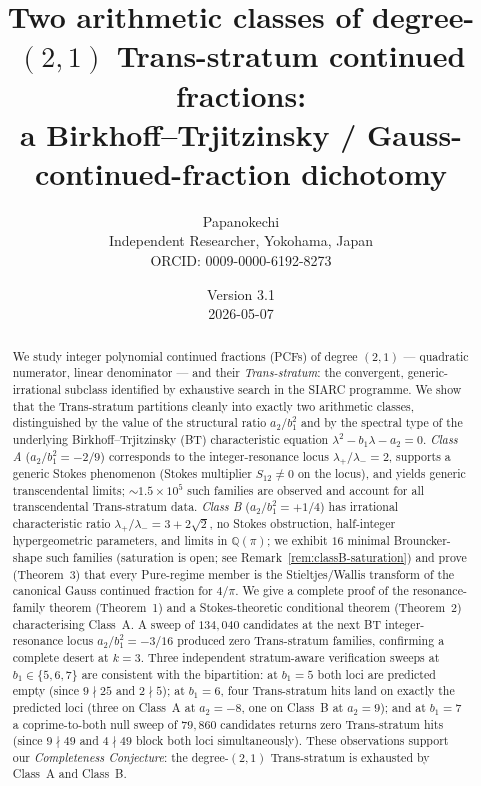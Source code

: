 \documentclass[11pt,a4paper]{article}
\title{Two arithmetic classes of degree-$(2,1)$ Trans-stratum continued fractions:\\
  a Birkhoff--Trjitzinsky / Gauss-continued-fraction dichotomy}
\author{Papanokechi\\
Independent Researcher, Yokohama, Japan\\
ORCID: 0009-0000-6192-8273\\
\email{ppapanokechi@gmail.com}}
\date{Version 3.1 \\ 2026-05-07}
\theoremstyle{definition}
\begin{document}
\maketitle

\begin{abstract}
We study integer polynomial continued fractions (PCFs) of degree $(2,1)$ — quadratic numerator, linear denominator — and their \emph{Trans-stratum}: the convergent, generic-irrational subclass identified by exhaustive search in the SIARC programme. We show that the Trans-stratum partitions cleanly into exactly two arithmetic classes, distinguished by the value of the structural ratio $a_2/b_1^2$ and by the spectral type of the underlying Birkhoff--Trjitzinsky (BT) characteristic equation $\lambda^2 - b_1\lambda - a_2 = 0$. \emph{Class A} ($a_2/b_1^2 = -2/9$) corresponds to the integer-resonance locus $\lambda_+ /\lambda_- = 2$, supports a generic Stokes phenomenon (Stokes multiplier $S_{12}\ne 0$ on the locus), and yields generic transcendental limits; $\sim\!1.5\times 10^5$ such families are observed and account for all transcendental Trans-stratum data. \emph{Class B} ($a_2/b_1^2 = +1/4$) has irrational characteristic ratio $\lambda_+/\lambda_- = 3+2\sqrt{2}$, no Stokes obstruction, half-integer hypergeometric parameters, and limits in $\mathbb{Q}(\pi)$; we exhibit $16$ minimal Brouncker-shape such families (saturation is open; see Remark~\ref{rem:classB-saturation}) and prove (Theorem~3) that every Pure-regime member is the Stieltjes/Wallis transform of the canonical Gauss continued fraction for $4/\pi$. We give a complete proof of the resonance-family theorem (Theorem~1) and a Stokes-theoretic conditional theorem (Theorem~2) characterising Class~A. A sweep of $134{,}040$ candidates at the next BT integer-resonance locus $a_2/b_1^2 = -3/16$ produced zero Trans-stratum families, confirming a complete desert at $k=3$. Three independent stratum-aware verification sweeps at $b_1 \in \{5, 6, 7\}$ are consistent with the bipartition: at $b_1 = 5$ both loci are predicted empty (since $9 \nmid 25$ and $2 \nmid 5$); at $b_1 = 6$, four Trans-stratum hits land on exactly the predicted loci (three on Class~A at $a_2 = -8$, one on Class~B at $a_2 = 9$); and at $b_1 = 7$ a coprime-to-both null sweep of $79{,}860$ candidates returns zero Trans-stratum hits (since $9 \nmid 49$ and $4 \nmid 49$ block both loci simultaneously). These observations support our \emph{Completeness Conjecture}: the degree-$(2,1)$ Trans-stratum is exhausted by Class~A and Class~B.
\end{abstract}
\end{document}
